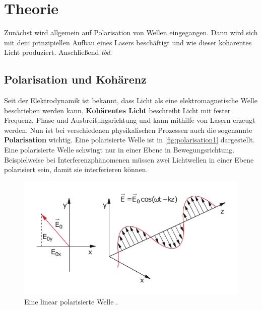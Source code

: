\section{Theorie}
\label{sec:Theorie}

Zunächst wird allgemein auf Polarisation von Wellen eingegangen.
Dann wird sich mit dem prinzipiellen Aufbau eines Lasers beschäftigt und wie dieser kohärentes Licht produziert.
Anschließend \textit{tbd}.

\subsection{Polarisation und Kohärenz} \label{sec:polarisation}
Seit der Elektrodynamik ist bekannt, dass Licht als eine elektromagnetische Welle beschrieben werden kann.
\textbf{Kohärentes Licht} beschreibt Licht mit fester Frequenz, Phase und Ausbreitungsrichtung und kann mithilfe von Lasern erzeugt werden.
Nun ist bei verschiedenen physikalischen Prozessen auch die sogenannte \textbf{Polarisation} wichtig.
Eine polarisierte Welle ist in \autoref{fig:polarisation1} dargestellt.
Eine polarisierte Welle schwingt nur in einer Ebene in Bewegungsrichtung.
Beispielweise bei Interferenzphänomenen müssen zwei Lichtwellen in einer Ebene polarisiert sein, damit sie interferieren können.
\begin{figure}
    \centering
    \includegraphics[width = 0.7 \linewidth]{pictures/polarisation1.pdf}
    \caption{Eine linear polarisierte Welle \cite{demtroeder2}.}
    \label{fig:polarisation1}
\end{figure}
